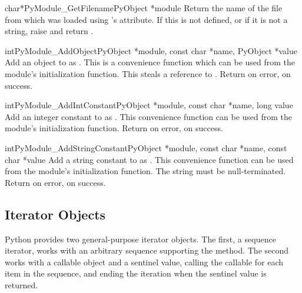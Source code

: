 \begin{cfuncdesc}{char*}{PyModule_GetFilename}{PyObject *module}
  Return the name of the file from which  was loaded using
  's  attribute.  If this is not defined,
  or if it is not a string, raise  and return
  \NULL{}.
\end{cfuncdesc}

\begin{cfuncdesc}{int}{PyModule_AddObject}{PyObject *module,
                                           const char *name, PyObject *value}
  Add an object to  as .  This is a convenience
  function which can be used from the module's initialization
  function.  This steals a reference to .  Return
   on error,  on success.
\end{cfuncdesc}

\begin{cfuncdesc}{int}{PyModule_AddIntConstant}{PyObject *module,
                                                const char *name, long value}
  Add an integer constant to  as .  This
  convenience function can be used from the module's initialization
  function. Return  on error,  on success.
\end{cfuncdesc}

\begin{cfuncdesc}{int}{PyModule_AddStringConstant}{PyObject *module,
                                                   const char *name, const char *value}
  Add a string constant to  as .  This
  convenience function can be used from the module's initialization
  function.  The string  must be null-terminated.  Return
   on error,  on success.
\end{cfuncdesc}


\subsection{Iterator Objects \label{iterator-objects}}

Python provides two general-purpose iterator objects.  The first, a
sequence iterator, works with an arbitrary sequence supporting the
 method.  The second works with a callable
object and a sentinel value, calling the callable for each item in the
sequence, and ending the iteration when the sentinel value is
returned.

